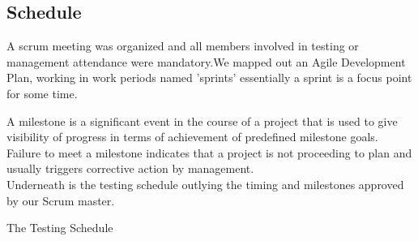 \subsection{Schedule}



A scrum meeting was organized and all members involved in testing or management attendance were mandatory.We mapped out an Agile Development Plan, working in work periods named 'sprints' essentially a sprint is a focus point for some time.\


A milestone is a significant event in the course of a project that is used to give visibility of progress in terms of achievement of predefined milestone goals. Failure to meet a milestone indicates that a project is not proceeding to plan and usually triggers corrective action by management.\\


Underneath is the testing schedule outlying the timing and milestones approved by our Scrum master.\\


\centerline{ The Testing Schedule}

